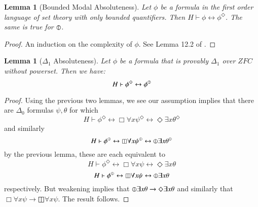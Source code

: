 \documentclass{article}
\newcommand\D{\circledbar}
\newcommand\B{\boxbar}
\newtheorem{lemma}[theorem]{Lemma}
\begin{document}
\begin{lemma}[Bounded Modal Absoluteness]\label{BMA}
    Let $\phi$ be 
    a formula in the first order language of set theory
    with only bounded quantifiers. Then
    $H\vdash \phi \leftrightarrow \phi^\Diamond$.
    The same is true for $\D$.
\end{lemma}
\begin{proof}
    An induction on the complexity of $\phi$. See Lemma 12.2 of \cite{OL2018}.
\end{proof}
\begin{lemma}[$\Delta_1$ Absoluteness]\label{DA}
    Let $\phi$ be a formula that is provably $\Delta_1$ over $ZFC$ without 
    powerset. Then we have: 
    \[H\vdash \phi^{\Diamond} \leftrightarrow \phi^{\D}\]
\end{lemma}
\begin{proof}
    Using the previous two lemmas, we see our assumption implies that there are $\Delta_0$ formulas $\psi, \theta$
    for which
    \[H\vdash \phi^\Diamond \leftrightarrow 
    \Box \forall x \psi^\Diamond \leftrightarrow 
    \Diamond \exists x \theta^\Diamond \] 
    and similarly
    \[H\vdash \phi^{\D} \leftrightarrow 
    \B \forall x \psi^{\D} \leftrightarrow 
    \D \exists x \theta^{\D} \] 
    by the previous lemma, these are each equivalent to 
    \[H\vdash \phi^\Diamond \leftrightarrow 
    \Box \forall x \psi \leftrightarrow 
    \Diamond \exists x \theta \] 
    \[H\vdash \phi^{\D} \leftrightarrow 
    \B \forall x \psi \leftrightarrow 
    \D \exists x \theta \] 
    respectively. But weakening implies that 
    $\D \exists x \theta \rightarrow \Diamond \exists x \theta$
    and similarly that $\Box \forall x \psi \rightarrow \B \forall x \psi$.
    The result follows.
\end{proof}
\end{document}
